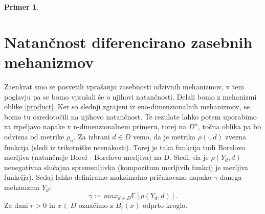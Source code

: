 \documentclass[12pt,a4paper]{amsart}
\theoremstyle{definition} %
\newtheorem{primer}[definicija]{Primer}
\theoremstyle{plain} %
\begin{document}
\begin{primer}
\end{primer}


\section{Natančnost diferencirano zasebnih mehanizmov}
Zaenkrat smo se posvetili vprašanju zasebnosti odzivnih mehanizmov, v tem poglavju pa se bomo vprašali še o njihovi natančnosti. Delali bomo z mehanizmi oblike \eqref{product}. Ker so slednji zgrajeni iz eno-dimenzionalnih mehanizmov, se bomo tu osredotočili na njihovo natančnost. Te rezulate lahko potem uporabimo za izpeljavo napake v n-dimenzionalnem primeru, torej na $D^n$, točna oblika pa bo odvisna od metrike $\rho_n$.
\newline
\newline
Za izbrani $d \in D$ vemo, da je metrika $\rho( \cdot , d)$ zvezna funkcija (sledi iz trikotniške neenakosti). Torej je taka funkcija tudi Borelovo merljiva (natančneje Borel - Borelovo merljiva) na D.  Sledi, da je $\rho(Y_d,d)$ nenegativna slučajna spremenljivka (kompozitum merljivih funkcij je merljiva funkcija). Sedaj lahko definiramo maksimalno pričakovano napako $\gamma$ danega mehanizma $Y_d$: $$\gamma := max_{d\in D}\mathbb{E}[\rho(Y_d,d)].$$ Za dani $r > 0$ in $x \in D$ označimo z $B_r(x)$ odprto kroglo. 
\end{document}
